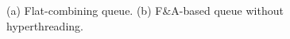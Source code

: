 \begin{figure}[ht!]
\centering
{}

\caption{(a) Flat-combining queue. (b) F\&A-based queue without hyperthreading.}
\label{figure:FC_FandA_queues}
\end{figure}